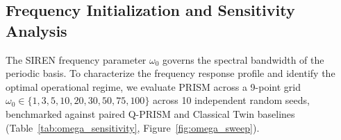 \documentclass[10pt,twocolumn,letterpaper]{article}
\begin{document}
\subsection{Frequency Initialization and Sensitivity Analysis}

The SIREN frequency parameter $\omega_0$ governs the spectral bandwidth of the periodic basis. To characterize the frequency response profile and identify the optimal operational regime, we evaluate PRISM across a 9-point grid $\omega_0 \in \{1, 3, 5, 10, 20, 30, 50, 75, 100\}$ across 10 independent random seeds, benchmarked against paired Q-PRISM and Classical Twin baselines (Table~\ref{tab:omega_sensitivity}, Figure~\ref{fig:omega_sweep}).

\begin{table}[t]
\centering
\small
\caption{\textbf{Extended SIREN $\omega_0$ Sensitivity Grid with Paired Q-PRISM Reference} ($N=1{,}000$, 10 seeds for PRISM/Twin, 5 seeds for Q-PRISM; all models $2{,}527$ params). Test MAE (eV; Dipole in Debye), mean $\pm$ std. Statistical significance vs.\ Classical Twin under Benjamini--Hochberg FDR correction ($m = 36$ hypotheses): $^{*}q<0.05$, $^{**}q<0.01$, $^{***}q<0.001$. $^{\ddagger}$: PRISM significantly outperforms Q-PRISM ($q_{\mathrm{FDR}}<0.05$, paired $t$-test). Best PRISM result per row in \textbf{bold}.}
\label{tab:omega_sensitivity}
\end{table}
\end{document}
